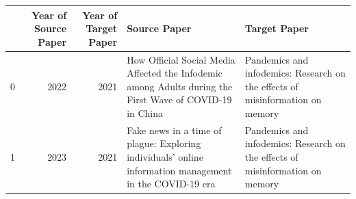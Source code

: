 \begin{tabular}{lrrll}
\toprule
 & Year of Source Paper & Year of Target Paper & Source Paper & Target Paper \\
\midrule
0 & 2022 & 2021 & How Official Social Media Affected the Infodemic among Adults during the First Wave of COVID-19 in China & Pandemics and infodemics: Research on the effects of misinformation on memory \\
1 & 2023 & 2021 & Fake news in a time of plague: Exploring individuals’ online information management in the COVID-19 era & Pandemics and infodemics: Research on the effects of misinformation on memory \\
\bottomrule
\end{tabular}
